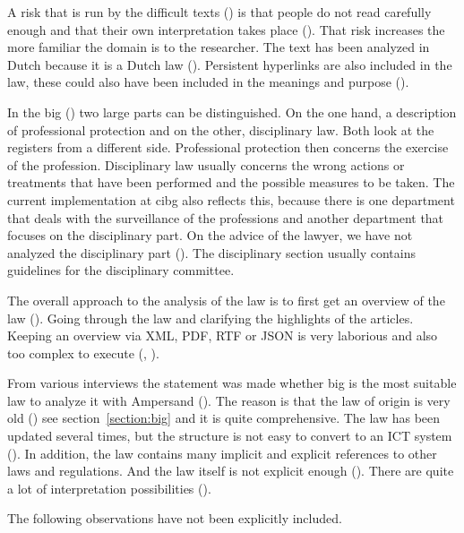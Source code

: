 A risk that is run by the difficult texts () is that people do not read carefully enough and that their own interpretation takes place ().
That risk increases the more familiar the domain is to the researcher.
The text has been analyzed in Dutch because it is a Dutch law ().
Persistent hyperlinks are also included in the law, these could also have been included in the meanings and purpose ().

In the \acrshort{big} () two large parts can be distinguished.
On the one hand, a description of professional protection and on the other, disciplinary law.
Both look at the registers from a different side.
Professional protection then concerns the exercise of the profession.
Disciplinary law usually concerns the wrong actions or treatments that have been performed and the possible measures to be taken.
The current implementation at \acrshort{cibg} also reflects this, because there is one department that deals with the surveillance of the professions and another department that focuses on the disciplinary part.
On the advice of the lawyer, we have not analyzed the disciplinary part ().
The disciplinary section usually contains guidelines for the disciplinary committee.

The overall approach to the analysis of the law is to first get an overview of the law ().
Going through the law and clarifying the highlights of the articles.
Keeping an overview via XML, PDF, RTF or JSON is very laborious and also too complex to execute (, ).

From various interviews the statement was made whether \acrshort{big} is the most suitable law to analyze it with Ampersand ().
The reason is that the law of origin is very old () see section~\ref{section:big} and it is quite comprehensive.
The law has been updated several times, but the structure is not easy to convert to an ICT system ().
In addition, the law contains many implicit and explicit references to other laws and regulations.
And the law itself is not explicit enough ().
There are quite a lot of interpretation possibilities ().

The following observations have not been explicitly included.
